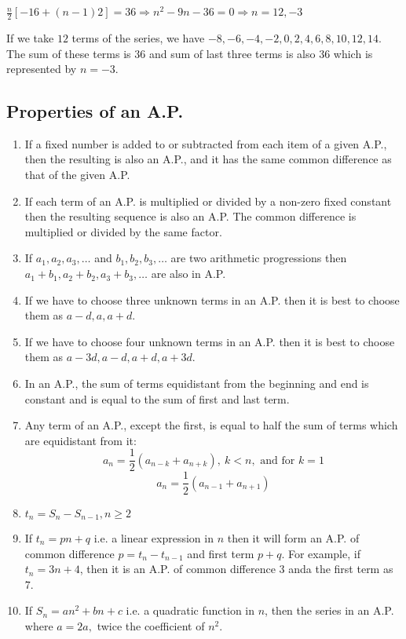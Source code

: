 $\frac{n}{2}[-16 + (n - 1)2] = 36\Rightarrow n^2 - 9n - 36 = 0 \Rightarrow n = 12, -3$

If we take $12$ terms of the series, we have $-8, -6, -4, -2, 0, 2, 4, 6, 8, 10, 12, 14$. The sum of these terms is $36$ and sum of
last three terms is also $36$ which is represented by $n = -3$.

\subsection{Properties of an A.P.}
\begin{enumerate}
\item If a fixed number is added to or subtracted from each item of a given A.P., then the resulting is also an A.P., and it has
  the same common difference as that of the given A.P.
\item If each term of an A.P. is multiplied or divided by a non-zero fixed constant then the resulting sequence is also an A.P. The
  common difference is multiplied or divided by the same factor.
\item If $a_1, a_2, a_3, \ldots$ and $b_1, b_2, b_3, \ldots$ are two arithmetic progressions then $a_1 + b_1, a_2 + b_2, a_3 + b_3,
  \ldots$ are also in A.P.
\item If we have to choose three unknown terms in an A.P. then it is best to choose them as $a - d, a, a + d$.
\item If we have to choose four unknown terms in an A.P. then it is best to choose them as $a - 3d, a - d, a + d, a + 3d$.
\item In an A.P., the sum of terms equidistant from the beginning and end is constant and is equal to the sum of first and last
  term.
\item Any term of an A.P., except the first, is equal to half the sum of terms which are equidistant from it:
  $$a_n = \frac{1}{2}(a_{n - k} + a_{n + k}), ~k<n,\text{~and for~} k = 1$$
  $$a_n = \frac{1}{2}(a_{n - 1} + a_{n + 1})$$
\item $t_n = S_n - S_{n - 1}, n\geq 2$
\item If $t_n = pn + q$ i.e. a linear expression in $n$ then it will form an A.P. of common difference $p = t_n - t_{n - 1}$ and
  first term $p + q$. For example, if $t_n = 3n + 4$, then it is an A.P. of common difference $3$ anda the first term as $7$.
\item If $S_n = an^2 + bn + c$ i.e. a quadratic function in $n$, then the series in an A.P. where $a = 2a,$ twice the coefficient
  of $n^2$.
\end{enumerate}

